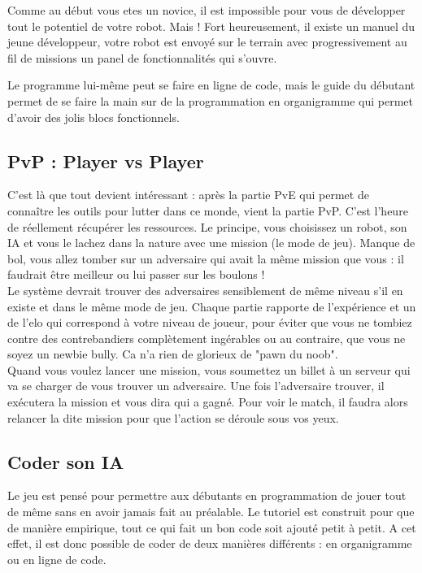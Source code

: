 \documentclass[10pt]{article}
\begin{document}
Comme au début vous etes un novice, il est impossible pour vous de développer tout le potentiel de votre robot. Mais ! Fort heureusement, il existe un manuel du jeune développeur, votre robot est envoyé sur le terrain avec progressivement au fil de missions un panel de fonctionnalités qui s'ouvre.
	
Le programme lui-même peut se faire en ligne de code, mais le guide du débutant permet de se faire la main sur de la programmation en organigramme qui permet d'avoir des jolis blocs fonctionnels.

\subsection{PvP : Player vs Player}

C'est là que tout devient intéressant :  après la partie PvE qui permet de connaître les outils pour lutter dans ce monde, vient la partie PvP. C'est l'heure de réellement récupérer les ressources. Le principe, vous choisissez un robot, son IA et vous le lachez dans la nature avec une mission (le mode de jeu). Manque de bol, vous allez tomber sur un adversaire qui avait la même mission que vous : il faudrait être meilleur ou lui passer sur les boulons ! \\
Le système devrait trouver des adversaires sensiblement de même niveau s'il en existe et dans le même mode de jeu. Chaque partie rapporte de l'expérience et un de l'elo qui correspond à votre niveau de joueur, pour éviter que vous ne tombiez contre des contrebandiers complètement ingérables ou au contraire, que vous ne soyez un newbie bully. Ca n'a rien de glorieux de "pawn du noob".\\
Quand vous voulez lancer une mission, vous soumettez un billet à un serveur qui va se charger de vous trouver un adversaire. Une fois l'adversaire trouver, il exécutera la mission et vous dira qui a gagné. Pour voir le match, il faudra alors relancer la dite mission pour que l'action se déroule sous vos yeux. 
 
\subsection{Coder son IA}

Le jeu est pensé pour permettre aux débutants en programmation de jouer tout de même sans en avoir jamais fait au préalable. Le tutoriel est construit pour que de manière empirique, tout ce qui fait un bon code soit ajouté petit à petit. A cet effet, il est donc possible de coder de deux manières différents : en organigramme ou en ligne de code.
\end{document}
